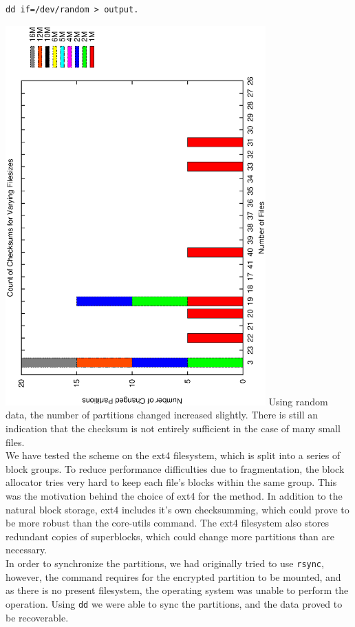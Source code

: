 \documentclass[12pt]{article}
\begin{document}
\begin{verbatim}
dd if=/dev/random > output.
\end{verbatim}
\includegraphics[width=10cm,angle=-90]{rcount.eps}
Using random data, the number of partitions changed increased slightly. There is still an indication that the checksum is not entirely sufficient in the case of many small files.
~\\
We have tested the scheme on the ext4 filesystem, which is split into a series of block groups. To reduce performance difficulties due to fragmentation, the block allocator tries very hard to keep each file's blocks within the same group. This was the motivation behind the choice of ext4 for the method. In addition to the natural block storage, ext4 includes it's own checksumming, which could prove to be more robust than the core-utils command. The ext4 filesystem also stores redundant copies of superblocks, which could change more partitions than are necessary. 
~\\
In order to synchronize the partitions, we had originally tried to use \verb|rsync|, however, the command requires for the encrypted partition to be mounted, and as there is no present filesystem, the operating system was unable to perform the operation. Using \verb|dd| we were able to sync the partitions, and the data proved to be recoverable.\\
\end{document}
